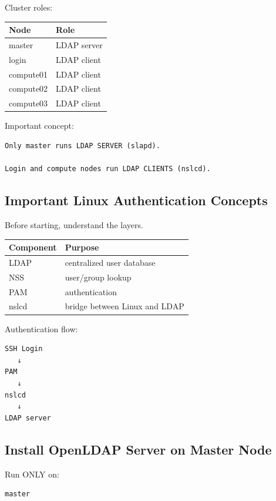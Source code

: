 \documentclass[11pt]{article}
\begin{document}
Cluster roles:

\begin{center}
\begin{tabular}{ll}
Node & Role\\
\hline
master & LDAP server\\
login & LDAP client\\
compute01 & LDAP client\\
compute02 & LDAP client\\
compute03 & LDAP client\\
\end{tabular}
\end{center}

Important concept:

\begin{verbatim}
Only master runs LDAP SERVER (slapd).

Login and compute nodes run LDAP CLIENTS (nslcd).
\end{verbatim}
\subsection{Important Linux Authentication Concepts}
\label{sec:org28dad75}

Before starting, understand the layers.

\begin{center}
\begin{tabular}{ll}
Component & Purpose\\
\hline
LDAP & centralized user database\\
NSS & user/group lookup\\
PAM & authentication\\
nslcd & bridge between Linux and LDAP\\
\end{tabular}
\end{center}

Authentication flow:

\begin{verbatim}
SSH Login
   ↓
PAM
   ↓
nslcd
   ↓
LDAP server
\end{verbatim}
\subsection{Install OpenLDAP Server on Master Node}
\label{sec:org235206e}

Run ONLY on:

\begin{verbatim}
master
\end{verbatim}
\end{document}
